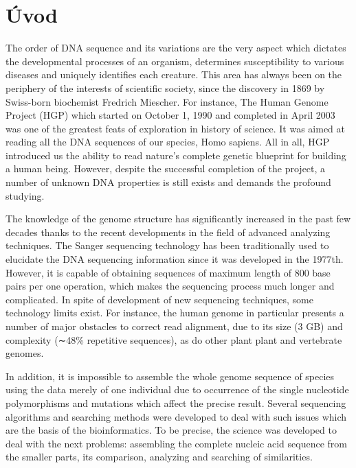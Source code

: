 
{}

\chapter*{Úvod}

\par The order of DNA sequence and its variations are the very aspect which dictates the developmental processes of an organism, determines susceptibility to various diseases and uniquely identifies each creature. This area has always been on the periphery of the interests of scientific society, since the discovery in 1869 by Swiss-born biochemist Fredrich Miescher. For instance, The Human Genome Project (HGP) which started on October 1, 1990 and completed in April 2003 was one of the greatest feats of exploration in history of science. It was aimed at reading all the DNA sequences of our species, Homo sapiens. All in all, HGP introduced us the ability to read nature's complete genetic blueprint for building a human being. However, despite the successful completion of the project, a number of unknown DNA properties is still exists and demands the profound studying.

The knowledge of the genome structure has significantly increased in the past few decades thanks to the recent developments in the field of advanced analyzing techniques. The Sanger sequencing technology has been traditionally used to elucidate the DNA sequencing information since it was developed in the 1977th. However, it is capable of obtaining sequences of maximum length of 800 base pairs per one operation, which makes the sequencing process much longer and complicated. In spite of development of new sequencing techniques, some technology limits exist. For instance, the human genome in particular presents a number of major obstacles to correct read alignment, due to its size (3 GB) and complexity (∼48\% repetitive sequences), as do other plant plant and vertebrate genomes.

In addition, it is impossible to assemble the whole genome sequence of species using the data merely of one individual due to occurrence of the single nucleotide polymorphisms and mutations which affect the precise result. Several sequencing algorithms and searching methods were developed to deal with such issues which are the basis of the bioinformatics. To be precise, the science was developed to deal with the next problems: assembling the complete nucleic acid sequence from the smaller parts, its comparison, analyzing and searching of similarities.

